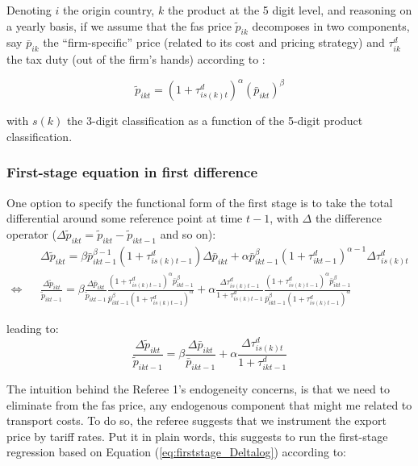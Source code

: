 \documentclass[a4paper,12pt]{article}
\begin{document}
Denoting $i$ the origin country, $k$ the product at the 5 digit level, and reasoning on a yearly basis, if we assume that the fas price $\widetilde{p}_{ik}$ decomposes in two components, say $\bar{p}_{ik}$ the ``firm-specific'' price (related to its cost and pricing strategy) and $\tau^d_{ik}$ the tax duty (out of the firm's hands) according to :

\begin{equation}
\widetilde{p}_{ikt} = (1+\tau^d_{is(k)t})^\alpha \left(\bar{p}_{ikt}\right)^\beta \label{eq:link_fas_duty}
\end{equation}

\noindent with $s(k)$ the 3-digit classification as a function of the 5-digit product classification.

\subsubsection{First-stage equation in first difference \label{ssec:first_diff}}

One option to specify the functional form of the first stage is to take the total differential around some reference point at time $t-1$, with $\Delta $ the difference operator ($\Delta\widetilde{p}_{ikt} = \widetilde{p}_{ikt} - \widetilde{p}_{ikt-1}$ and so on):
\begin{eqnarray*}
&&\Delta \widetilde{p}_{ikt} = \beta \bar{p}_{ikt-1}^{\beta-1}(1+\tau^d_{is(k)t-1})\Delta \bar{p}_{ikt} + \alpha \bar{p}^\beta_{ikt-1} (1+\tau^d_{ikt-1})^{\alpha-1}\Delta \tau^d_{is(k)t}  \\
\Leftrightarrow &&\frac{\Delta \widetilde{p}_{ikt}}{\widetilde{p}_{ikt-1}} = \beta \frac{\Delta \bar{p}_{ikt}}{\widetilde{p}_{ikt-1}} \frac{(1+\tau^d_{is(k)t-1})^\alpha \bar{p}_{ikt-1}^\beta}{\bar{p}^\beta_{ikt-1}(1+\tau^d_{is(k)t-1})^\alpha} +\alpha \frac{\Delta \tau^d_{is(k)t-1}}{1+\tau_{is(k)t-1}^d}\frac{(1+\tau^d_{is(k)t-1})^\alpha \bar{p}_{ikt-1}^\beta}{\bar{p}^\beta_{ikt-1}(1+\tau^d_{is(k)t-1})^\alpha} \end{eqnarray*}

leading to:
\begin{equation}
\frac{\Delta \widetilde{p}_{ikt}}{\widetilde{p}_{ikt-1}} =  \beta \frac{\Delta \bar{p}_{ikt}}{\bar{p}_{ikt-1}} +\alpha\frac{\Delta \tau^d_{is(k)t}}{1+\tau_{ikt-1}^d} \label{eq:firststage_Deltalog}
\end{equation}

The intuition behind the Referee 1's endogeneity concerns, is that we need to eliminate from the fas price, any endogenous component that might me related to transport costs. To do so, the referee suggests that we instrument the export price by tariff rates. Put it in plain words, this suggests to run the first-stage regression based on Equation (\ref{eq:firststage_Deltalog}) according to:
\end{document}
